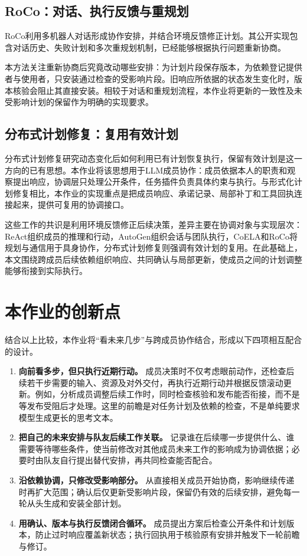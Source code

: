 \subsection{RoCo：对话、执行反馈与重规划}

RoCo利用多机器人对话形成协作安排，并结合环境反馈修正计划\cite{roco}。其公开实现包含对话历史、失败计划和多次重规划机制，已经能够根据执行问题重新协商。

本方法关注重新协商后究竟改动哪些安排：为计划片段保存版本，为依赖登记提供者与使用者，只安装通过检查的受影响片段。旧响应所依据的状态发生变化时，版本核验会阻止其直接安装。相较于对话和重规划流程，本作业将更新的一致性及未受影响计划的保留作为明确的实现要求。

\subsection{分布式计划修复：复用有效计划}

分布式计划修复研究动态变化后如何利用已有计划恢复执行\cite{repair}，保留有效计划是这一方向的已有思想。本作业将该思想用于LLM成员协作：成员依据本人的职责和观察提出响应，协调层只处理公开条件，任务插件负责具体约束与执行。与形式化计划修复相比，本作业的实现重点是把成员响应、承诺记录、局部补丁和工具回执连接起来，提供可复用的协调接口。

这些工作的共识是利用环境反馈修正后续决策，差异主要在协调对象与实现层次：ReAct组织成员的推理和行动，AutoGen组织会话与团队执行，CoELA和RoCo将规划与通信用于具身协作，分布式计划修复则强调有效计划的复用。在此基础上，本文围绕跨成员后续依赖组织响应、共同确认与局部更新，使成员之间的计划调整能够衔接到实际执行。

\section{本作业的创新点}

结合以上比较，本作业将“看未来几步”与跨成员协作结合，形成以下四项相互配合的设计。

\begin{enumerate}
\item \textbf{向前看多步，但只执行近期行动。} 成员决策时不仅考虑眼前动作，还检查后续若干步需要的输入、资源及对外交付，再执行近期行动并根据反馈滚动更新。例如，分析成员调整后续工作时，同时检查核验和发布能否衔接，而不是等发布受阻后才处理。这里的前瞻是对任务计划及依赖的检查，不是单纯要求模型生成更长的思考文本。
\item \textbf{把自己的未来安排与队友后续工作关联。} 记录谁在后续哪一步提供什么、谁需要等待哪些条件，使当前修改对其他成员未来工作的影响成为协调依据；必要时由队友自行提出替代安排，再共同检查能否配合。
\item \textbf{沿依赖协调，只修改受影响部分。} 从直接相关成员开始协商，影响继续传递时再扩大范围；确认后仅更新受影响片段，保留仍有效的后续安排，避免每一轮从头生成和安装全部计划。
\item \textbf{用确认、版本与执行反馈闭合循环。} 成员提出方案后检查公开条件和计划版本，防止过时响应覆盖新状态；执行回执用于核验原有安排并触发下一轮前瞻与修订。
\end{enumerate}

